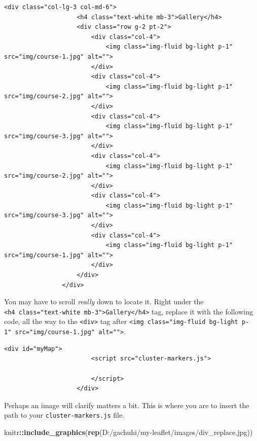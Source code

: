\documentclass[
]{book}
\newenvironment{Shaded}{\begin{snugshade}}{\end{snugshade}}
\newcommand{\FunctionTok}[1]{\textcolor[rgb]{0.13,0.29,0.53}{\textbf{#1}}}
\newcommand{\NormalTok}[1]{#1}
\newcommand{\SpecialCharTok}[1]{\textcolor[rgb]{0.81,0.36,0.00}{\textbf{#1}}}
\newcommand{\StringTok}[1]{\textcolor[rgb]{0.31,0.60,0.02}{#1}}
\begin{document}
\begin{verbatim}
<div class="col-lg-3 col-md-6">
                    <h4 class="text-white mb-3">Gallery</h4>
                    <div class="row g-2 pt-2">
                        <div class="col-4">
                            <img class="img-fluid bg-light p-1" src="img/course-1.jpg" alt="">
                        </div>
                        <div class="col-4">
                            <img class="img-fluid bg-light p-1" src="img/course-2.jpg" alt="">
                        </div>
                        <div class="col-4">
                            <img class="img-fluid bg-light p-1" src="img/course-3.jpg" alt="">
                        </div>
                        <div class="col-4">
                            <img class="img-fluid bg-light p-1" src="img/course-2.jpg" alt="">
                        </div>
                        <div class="col-4">
                            <img class="img-fluid bg-light p-1" src="img/course-3.jpg" alt="">
                        </div>
                        <div class="col-4">
                            <img class="img-fluid bg-light p-1" src="img/course-1.jpg" alt="">
                        </div>
                    </div>
                </div>
\end{verbatim}

You may have to scroll \emph{really} down to locate it. Right under the \texttt{\textless{}h4\ class="text-white\ mb-3"\textgreater{}Gallery\textless{}/h4\textgreater{}} tag, replace it with the following code, all the way to the \texttt{\textless{}div\textgreater{}} tag after \texttt{\textless{}img\ class="img-fluid\ bg-light\ p-1"\ src="img/course-1.jpg"\ alt=""\textgreater{}}.

\begin{verbatim}
<div id="myMap"> 
                        <script src="cluster-markers.js">

                        </script>
                    </div>
\end{verbatim}

Perhaps an image will clarify matters a bit. This is where you are to insert the path to your \texttt{cluster-markers.js} file.

\begin{Shaded}
\begin{Highlighting}[]
\NormalTok{knitr}\SpecialCharTok{::}\FunctionTok{include\_graphics}\NormalTok{(}\FunctionTok{rep}\NormalTok{(}\StringTok{\textquotesingle{}D:/gachuhi/my{-}leaflet/images/div\_replace.jpg\textquotesingle{}}\NormalTok{))}
\end{Highlighting}
\end{Shaded}
\end{document}

